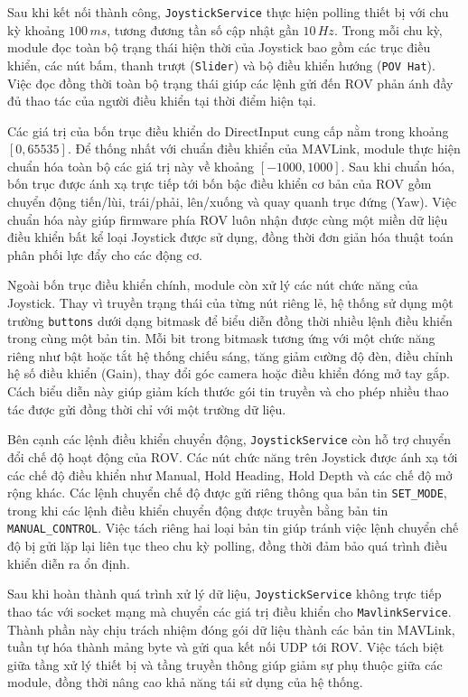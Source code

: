 \documentclass[../DoAn.tex]{subfiles}
\begin{document}
Sau khi kết nối thành công, \texttt{JoystickService} thực hiện polling
thiết bị với chu kỳ khoảng $100\,ms$, tương đương tần số cập nhật gần
$10\,Hz$. Trong mỗi chu kỳ, module đọc toàn bộ trạng thái hiện thời của
Joystick bao gồm các trục điều khiển, các nút bấm, thanh trượt
(\texttt{Slider}) và bộ điều khiển hướng (\texttt{POV Hat}). Việc đọc
đồng thời toàn bộ trạng thái giúp các lệnh gửi đến ROV phản ánh đầy đủ
thao tác của người điều khiển tại thời điểm hiện tại.

Các giá trị của bốn trục điều khiển do DirectInput cung cấp nằm trong
khoảng $[0,65535]$. Để thống nhất với chuẩn điều khiển của MAVLink,
module thực hiện chuẩn hóa toàn bộ các giá trị này về khoảng
$[-1000,1000]$. Sau khi chuẩn hóa, bốn trục được ánh xạ trực tiếp tới
bốn bậc điều khiển cơ bản của ROV gồm chuyển động tiến/lùi, trái/phải,
lên/xuống và quay quanh trục đứng (Yaw). Việc chuẩn hóa này giúp firmware
phía ROV luôn nhận được cùng một miền dữ liệu điều khiển bất kể loại
Joystick được sử dụng, đồng thời đơn giản hóa thuật toán phân phối lực
đẩy cho các động cơ.

Ngoài bốn trục điều khiển chính, module còn xử lý các nút chức năng của
Joystick. Thay vì truyền trạng thái của từng nút riêng lẻ, hệ thống sử
dụng một trường \texttt{buttons} dưới dạng bitmask để biểu diễn đồng
thời nhiều lệnh điều khiển trong cùng một bản tin. Mỗi bit trong bitmask
tương ứng với một chức năng riêng như bật hoặc tắt hệ thống chiếu sáng,
tăng giảm cường độ đèn, điều chỉnh hệ số điều khiển (Gain), thay đổi góc
camera hoặc điều khiển đóng mở tay gắp. Cách biểu diễn này giúp giảm kích
thước gói tin truyền và cho phép nhiều thao tác được gửi đồng thời chỉ
với một trường dữ liệu.

Bên cạnh các lệnh điều khiển chuyển động, \texttt{JoystickService} còn
hỗ trợ chuyển đổi chế độ hoạt động của ROV. Các nút chức năng trên
Joystick được ánh xạ tới các chế độ điều khiển như Manual, Hold Heading,
Hold Depth và các chế độ mở rộng khác. Các lệnh chuyển chế độ được gửi
riêng thông qua bản tin \texttt{SET\_MODE}, trong khi các lệnh điều
khiển chuyển động được truyền bằng bản tin
\texttt{MANUAL\_CONTROL}. Việc tách riêng hai loại bản tin giúp tránh
việc lệnh chuyển chế độ bị gửi lặp lại liên tục theo chu kỳ polling,
đồng thời đảm bảo quá trình điều khiển diễn ra ổn định.

Sau khi hoàn thành quá trình xử lý dữ liệu, \texttt{JoystickService}
không trực tiếp thao tác với socket mạng mà chuyển các giá trị điều
khiển cho \texttt{MavlinkService}. Thành phần này chịu trách nhiệm đóng
gói dữ liệu thành các bản tin MAVLink, tuần tự hóa thành mảng byte và
gửi qua kết nối UDP tới ROV. Việc tách biệt giữa tầng xử lý thiết bị và
tầng truyền thông giúp giảm sự phụ thuộc giữa các module, đồng thời nâng
cao khả năng tái sử dụng của hệ thống.
\end{document}
